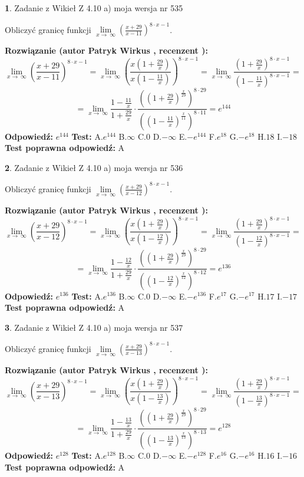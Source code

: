 \documentclass[12pt, a4paper]{article}
\theoremstyle{definition} %
\newtheorem{zad}{}
\newcommand{\zadStart}[1]{\begin{zad}#1\newline}
\newcommand{\zadStop}{\end{zad}}
\newcommand{\rozwStart}[2]{\noindent \textbf{Rozwiązanie (autor #1 , recenzent #2): }\newline}
\newcommand{\rozwStop}{\newline}
\newcommand{\odpStart}{\noindent \textbf{Odpowiedź:}\newline}
\newcommand{\odpStop}{\newline}
\newcommand{\testStart}{\noindent \textbf{Test:}\newline}
\newcommand{\testStop}{\newline}
\newcommand{\kluczStart}{\noindent \textbf{Test poprawna odpowiedź:}\newline}
\newcommand{\kluczStop}{\newline}
\begin{document}
\zadStart{Zadanie z Wikieł Z 4.10 a) moja wersja nr 535}

Obliczyć granicę funkcji  $\lim\limits_{x\to\ \infty}(\frac{x+29}{x-11})^{8\cdot x-1}$.
\zadStop
\rozwStart{Patryk Wirkus}{}
$$\lim\limits_{x\to\ \infty}(\frac{x+29}{x-11})^{8\cdot x-1} = \lim\limits_{x\to\ \infty}(\frac{x(1+\frac{29}{x})}{x(1-\frac{11}{x})})^{8\cdot x-1}=\lim\limits_{x\to\ \infty}\frac{(1+\frac{29}{x})^{8\cdot x-1}}{(1-\frac{11}{x})^{8\cdot x-1}}=$$
$$=\lim\limits_{x\to\ \infty}\frac{1-\frac{11}{x}}{1+\frac{29}{x}}\cdot\frac{((1+\frac{29}{x})^{\frac{x}{29}})^{8\cdot29}}{((1-\frac{11}{x})^{\frac{x}{11}})^{8\cdot11}}=e^{144}$$
\rozwStop
\odpStart
$e^{144}$
\odpStop
\testStart
A.$e^{144}$ B.$\infty$ C.$0$ D.$-\infty$ E.$-e^{144}$
F.$e^{18}$ G.$-e^{18}$
H.$18$
I.$-18$
\testStop
\kluczStart
A
\kluczStop



\zadStart{Zadanie z Wikieł Z 4.10 a) moja wersja nr 536}

Obliczyć granicę funkcji  $\lim\limits_{x\to\ \infty}(\frac{x+29}{x-12})^{8\cdot x-1}$.
\zadStop
\rozwStart{Patryk Wirkus}{}
$$\lim\limits_{x\to\ \infty}(\frac{x+29}{x-12})^{8\cdot x-1} = \lim\limits_{x\to\ \infty}(\frac{x(1+\frac{29}{x})}{x(1-\frac{12}{x})})^{8\cdot x-1}=\lim\limits_{x\to\ \infty}\frac{(1+\frac{29}{x})^{8\cdot x-1}}{(1-\frac{12}{x})^{8\cdot x-1}}=$$
$$=\lim\limits_{x\to\ \infty}\frac{1-\frac{12}{x}}{1+\frac{29}{x}}\cdot\frac{((1+\frac{29}{x})^{\frac{x}{29}})^{8\cdot29}}{((1-\frac{12}{x})^{\frac{x}{12}})^{8\cdot12}}=e^{136}$$
\rozwStop
\odpStart
$e^{136}$
\odpStop
\testStart
A.$e^{136}$ B.$\infty$ C.$0$ D.$-\infty$ E.$-e^{136}$
F.$e^{17}$ G.$-e^{17}$
H.$17$
I.$-17$
\testStop
\kluczStart
A
\kluczStop



\zadStart{Zadanie z Wikieł Z 4.10 a) moja wersja nr 537}

Obliczyć granicę funkcji  $\lim\limits_{x\to\ \infty}(\frac{x+29}{x-13})^{8\cdot x-1}$.
\zadStop
\rozwStart{Patryk Wirkus}{}
$$\lim\limits_{x\to\ \infty}(\frac{x+29}{x-13})^{8\cdot x-1} = \lim\limits_{x\to\ \infty}(\frac{x(1+\frac{29}{x})}{x(1-\frac{13}{x})})^{8\cdot x-1}=\lim\limits_{x\to\ \infty}\frac{(1+\frac{29}{x})^{8\cdot x-1}}{(1-\frac{13}{x})^{8\cdot x-1}}=$$
$$=\lim\limits_{x\to\ \infty}\frac{1-\frac{13}{x}}{1+\frac{29}{x}}\cdot\frac{((1+\frac{29}{x})^{\frac{x}{29}})^{8\cdot29}}{((1-\frac{13}{x})^{\frac{x}{13}})^{8\cdot13}}=e^{128}$$
\rozwStop
\odpStart
$e^{128}$
\odpStop
\testStart
A.$e^{128}$ B.$\infty$ C.$0$ D.$-\infty$ E.$-e^{128}$
F.$e^{16}$ G.$-e^{16}$
H.$16$
I.$-16$
\testStop
\kluczStart
A
\kluczStop
\end{document}
